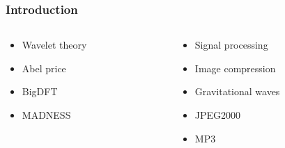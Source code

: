 
\begin{frame}
\frametitle{Introduction}
\centering

\begin{columns}
\begin{column}[b]{0.5\textwidth}
    \begin{itemize}
        \item   Wavelet theory
        \item   Abel price
        \item   BigDFT
        \item   MADNESS
    \end{itemize}
\end{column}
\begin{column}[b]{0.5\textwidth}
    \begin{itemize}
        \item   Signal processing
        \item   Image compression
        \item   Gravitational waves
        \item   JPEG2000
        \item   MP3
    \end{itemize}
\end{column}
\end{columns}
\end{frame}
